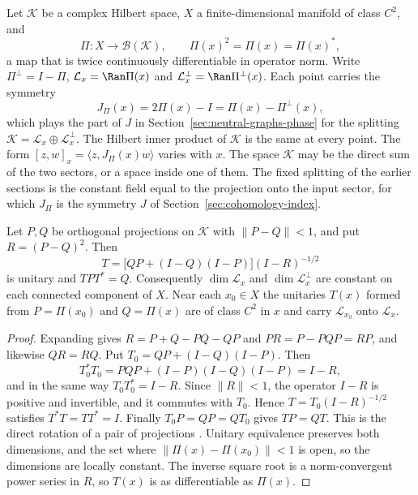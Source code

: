 Let $\mathcal K$ be a complex Hilbert space, $X$ a finite-dimensional manifold of class $C^2$, and
\begin{equation}
 \Pi:X\to\mathcal B(\mathcal K),\qquad \Pi(x)^2=\Pi(x)=\Pi(x)^* ,
 \label{eq:moving-projection-field}
\end{equation}
a map that is twice continuously differentiable in operator norm. Write $\Pi^\perp=I-\Pi$, $\mathcal L_x=\Ran\Pi(x)$ and $\mathcal L_x^\perp=\Ran\Pi^\perp(x)$. Each point carries the symmetry
\begin{equation}
 J_\Pi(x)=2\Pi(x)-I=\Pi(x)-\Pi^\perp(x),
 \label{eq:moving-symmetry}
\end{equation}
which plays the part of $J$ in Section~\ref{sec:neutral-graphs-phase} for the splitting $\mathcal K=\mathcal L_x\oplus\mathcal L_x^\perp$. The Hilbert inner product of $\mathcal K$ is the same at every point. The form $[z,w]_x=\langle z,J_\Pi(x)w\rangle$ varies with $x$. The space $\mathcal K$ may be the direct sum of the two sectors, or a space inside one of them. The fixed splitting of the earlier sections is the constant field equal to the projection onto the input sector, for which $J_\Pi$ is the symmetry $J$ of Section~\ref{sec:cohomology-index}.

\begin{proposition}
\label{prop:moving-unitary}
Let $P,Q$ be orthogonal projections on $\mathcal K$ with $\|P-Q\|<1$, and put $R=(P-Q)^2$. Then
\begin{equation}
 T=\bigl[QP+(I-Q)(I-P)\bigr](I-R)^{-1/2}
 \label{eq:moving-direct-rotation}
\end{equation}
is unitary and $TPT^*=Q$. Consequently $\dim\mathcal L_x$ and $\dim\mathcal L_x^\perp$ are constant on each connected component of $X$. Near each $x_0\in X$ the unitaries $T(x)$ formed from $P=\Pi(x_0)$ and $Q=\Pi(x)$ are of class $C^2$ in $x$ and carry $\mathcal L_{x_0}$ onto $\mathcal L_x$.
\end{proposition}
\begin{proof}
Expanding gives $R=P+Q-PQ-QP$ and $PR=P-PQP=RP$, and likewise $QR=RQ$. Put $T_0=QP+(I-Q)(I-P)$. Then
\[
 T_0^*T_0=PQP+(I-P)(I-Q)(I-P)=I-R ,
\]
and in the same way $T_0T_0^*=I-R$. Since $\|R\|<1$, the operator $I-R$ is positive and invertible, and it commutes with $T_0$. Hence $T=T_0(I-R)^{-1/2}$ satisfies $T^*T=TT^*=I$. Finally $T_0P=QP=QT_0$ gives $TP=QT$. This is the direct rotation of a pair of projections \cite[Ch.~I, \S\S4.6 and 6.8]{Kato}. Unitary equivalence preserves both dimensions, and the set where $\|\Pi(x)-\Pi(x_0)\|<1$ is open, so the dimensions are locally constant. The inverse square root is a norm-convergent power series in $R$, so $T(x)$ is as differentiable as $\Pi(x)$.
\end{proof}

